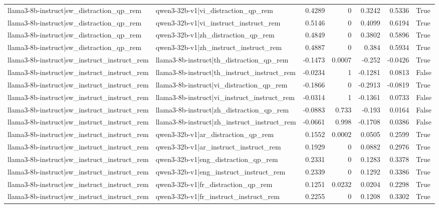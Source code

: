 \begin{table}
\begin{tabular}{l l r r r r l}
llama3-8b-instruct|sw_distraction_qp_rem & qwen3-32b-v1|vi_distraction_qp_rem & 0.4289 & 0 & 0.3242 & 0.5336 & True \\
llama3-8b-instruct|sw_distraction_qp_rem & qwen3-32b-v1|vi_instruct_instruct_rem & 0.5146 & 0 & 0.4099 & 0.6194 & True \\
llama3-8b-instruct|sw_distraction_qp_rem & qwen3-32b-v1|zh_distraction_qp_rem & 0.4849 & 0 & 0.3802 & 0.5896 & True \\
llama3-8b-instruct|sw_distraction_qp_rem & qwen3-32b-v1|zh_instruct_instruct_rem & 0.4887 & 0 & 0.384 & 0.5934 & True \\
llama3-8b-instruct|sw_instruct_instruct_rem & llama3-8b-instruct|th_distraction_qp_rem & -0.1473 & 0.0007 & -0.252 & -0.0426 & True \\
llama3-8b-instruct|sw_instruct_instruct_rem & llama3-8b-instruct|th_instruct_instruct_rem & -0.0234 & 1 & -0.1281 & 0.0813 & False \\
llama3-8b-instruct|sw_instruct_instruct_rem & llama3-8b-instruct|vi_distraction_qp_rem & -0.1866 & 0 & -0.2913 & -0.0819 & True \\
llama3-8b-instruct|sw_instruct_instruct_rem & llama3-8b-instruct|vi_instruct_instruct_rem & -0.0314 & 1 & -0.1361 & 0.0733 & False \\
llama3-8b-instruct|sw_instruct_instruct_rem & llama3-8b-instruct|zh_distraction_qp_rem & -0.0883 & 0.733 & -0.193 & 0.0164 & False \\
llama3-8b-instruct|sw_instruct_instruct_rem & llama3-8b-instruct|zh_instruct_instruct_rem & -0.0661 & 0.998 & -0.1708 & 0.0386 & False \\
llama3-8b-instruct|sw_instruct_instruct_rem & qwen3-32b-v1|ar_distraction_qp_rem & 0.1552 & 0.0002 & 0.0505 & 0.2599 & True \\
llama3-8b-instruct|sw_instruct_instruct_rem & qwen3-32b-v1|ar_instruct_instruct_rem & 0.1929 & 0 & 0.0882 & 0.2976 & True \\
llama3-8b-instruct|sw_instruct_instruct_rem & qwen3-32b-v1|eng_distraction_qp_rem & 0.2331 & 0 & 0.1283 & 0.3378 & True \\
llama3-8b-instruct|sw_instruct_instruct_rem & qwen3-32b-v1|eng_instruct_instruct_rem & 0.2339 & 0 & 0.1292 & 0.3386 & True \\
llama3-8b-instruct|sw_instruct_instruct_rem & qwen3-32b-v1|fr_distraction_qp_rem & 0.1251 & 0.0232 & 0.0204 & 0.2298 & True \\
llama3-8b-instruct|sw_instruct_instruct_rem & qwen3-32b-v1|fr_instruct_instruct_rem & 0.2255 & 0 & 0.1208 & 0.3302 & True \\

\end{tabular}
\end{table}
